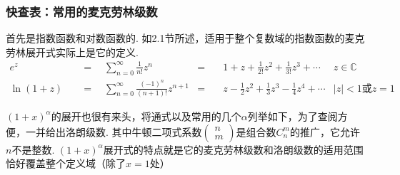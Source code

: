 \documentclass[UTF8]{ctexart}
\begin{document}
\newpage
\subsubsection{快查表：常用的麦克劳林级数}

首先是指数函数和对数函数的. 如2.1节所述，适用于整个复数域的指数函数的麦克劳林展开式实际上是它的定义.
\begin{align*}
    e^z \quad&=\quad \sum_{n=0}^{\infty} \frac{1}{n!}z^n &=&\quad 1+z+\frac{1}{2!}z^2+\frac{1}{3!}z^3 +\cdots &z\in \mathbb{C} \\
    \ln(1+z) \quad&=\quad \sum_{n=0}^{\infty}\frac{(-1)^n}{(n+1)!}z^{n+1} &=&\quad z-\frac{1}{2}z^2+\frac{1}{3}z^3-\frac{1}{4}z^4+\cdots & |z|<1\mbox{或}z=1
\end{align*}

\((1+x)^{\alpha}\)的展开也很有来头，将通式以及常用的几个\(\alpha\)列举如下，为了查阅方便，一并给出洛朗级数. 其中牛顿二项式系数\(\begin{pmatrix}n\\m\end{pmatrix}\)是组合数\(C_n^m\)的推广，它允许\(n\)不是整数. \((1+x)^{\alpha}\)展开式的特点就是它的麦克劳林级数和洛朗级数的适用范围恰好覆盖整个定义域（除了\(x=1\)处）
\end{document}
